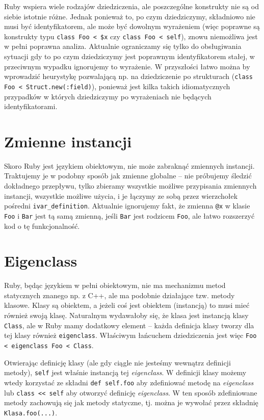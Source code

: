 \documentclass[declaration,shortabstract,mgr]{iithesis}
\begin{document}
Ruby wspiera wiele rodzajów dziedziczenia, ale poszczególne konstrukty nie są od siebie istotnie różne. Jednak ponieważ to, po czym dziedziczymy, składniowo nie musi być identyfikatorem, ale może być dowolnym wyrażeniem (więc poprawne są konstrukty typu \texttt{class Foo < \$x} czy \texttt{class Foo < self}), znowu niemożliwa jest w pełni poprawna analiza. Aktualnie ograniczamy się tylko do obsługiwania sytuacji gdy to po czym dziedziczymy jest poprawnym identyfikatorem stałej, w przeciwnym wypadku ignorujemy to wyrażenie. W przyszłości łatwo można by wprowadzić heurystykę pozwalającą np. na dziedziczenie po strukturach (\texttt{class Foo < Struct.new(:field)}), ponieważ jest kilka takich idiomatycznych przypadków w których dziedziczymy po wyrażeniach nie będących identyfikatorami.

\section{Zmienne instancji}

Skoro Ruby jest językiem obiektowym, nie może zabraknąć zmiennych instancji. Traktujemy je w podobny sposób jak zmienne globalne -- nie próbujemy śledzić dokładnego przepływu, tylko zbieramy wszystkie możliwe przypisania zmiennych instancji, wszystkie możliwe użycia, i je łączymy ze sobą przez wierzchołek pośredni \texttt{ivar\_definition}. Aktualnie ignorujemy fakt, że zmienna \texttt{@x} w klasie \texttt{Foo} i \texttt{Bar} jest tą samą zmienną, jeśli \texttt{Bar} jest rodzicem \texttt{Foo}, ale łatwo rozszerzyć kod o tę funkcjonalność.

\section{Eigenclass}

Ruby, będąc językiem w pełni obiektowym, nie ma mechanizmu metod statycznych znanego np. z C++, ale ma podobnie działające tzw. metody klasowe. Klasy są obiektem, a jeżeli coś jest obiektem (instancją) to musi mieć również swoją klasę. Naturalnym wydawałoby się, że klasa jest instancją klasy \texttt{Class}, ale w Ruby mamy dodatkowy element -- każda definicja klasy tworzy dla tej klasy również \texttt{eigenclass}. Właściwym łańcuchem dziedziczenia jest więc \texttt{Foo < eigenclass Foo < Class}.

Otwierając definicję klasy (ale gdy ciągle nie jesteśmy wewnątrz definicji metody), \texttt{self} jest właśnie instancją tej \textit{eigenclass}. W definicji klasy możemy wtedy korzystać ze składni \texttt{def self.foo} aby zdefiniować metodę na \textit{eigenclass} lub \texttt{class << self} aby otworzyć definicję \textit{eigenclass}. W ten sposób zdefiniowane metody zachowują się jak metody statyczne, tj. można je wywołać przez składnię \texttt{Klasa.foo(...)}.
\end{document}
